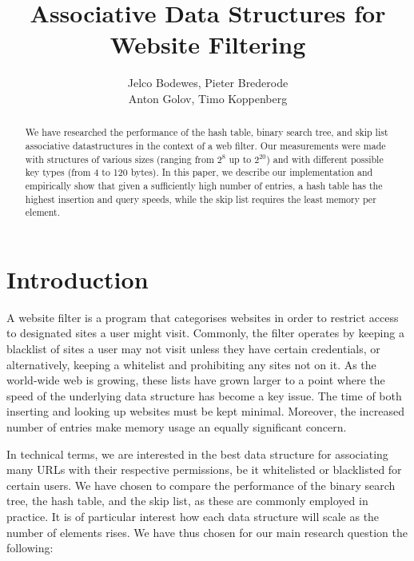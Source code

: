 \documentclass[12pt,a4paper]{article}
\title{Associative Data Structures for Website Filtering}
\author{Jelco Bodewes, Pieter Brederode \\ Anton Golov, Timo Koppenberg }
\begin{document}
    \maketitle

    \begin{abstract}
        We have researched the performance of the hash table, binary search tree, and skip list
        associative datastructures in the context of a web filter.  Our measurements were made with
        structures of various sizes (ranging from $2^8$ up to $2^{20}$) and with different possible
        key types (from 4 to 120 bytes).  In this paper, we describe our implementation and
        empirically show that given a sufficiently high number of entries, a hash table has the
        highest insertion and query speeds, while the skip list requires the least memory per
        element.
    \end{abstract}


    \section{Introduction}
    A website filter is a program that categorises websites in order to restrict access to
    designated sites a user might visit. Commonly, the filter operates by keeping a blacklist of
    sites a user may not visit unless they have certain credentials, or alternatively, keeping a
    whitelist and prohibiting any sites not on it.  As the world-wide web is growing, these lists
    have grown larger to a point where the speed of the underlying data structure has become a key
    issue.  The time of both inserting and looking up websites must be kept minimal. Moreover, the
    increased number of entries make memory usage an equally significant concern.

    In technical terms, we are interested in the best data structure for associating many URLs with
    their respective permissions, be it whitelisted or blacklisted for certain users.  We have
    chosen to compare the performance of the binary search tree, the hash table, and the skip list, as
    these are commonly employed in practice.  It is of particular interest how each data structure
    will scale as the number of elements rises.  We have thus chosen for our main research question
    the following:
\end{document}
